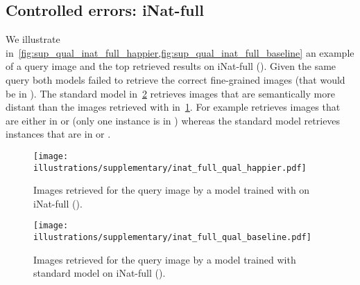 \subsection{Controlled errors: iNat-full} 

We illustrate in~\cref{fig:sup_qual_inat_full_happier,fig:sup_qual_inat_full_baseline} an example of a query image and the top  retrieved results on iNat-full (). Given the same query both models failed to retrieve the correct fine-grained images (that would be in ). The standard model in~\cref{fig:sup_qual_inat_full_baseline} retrieves images that are semantically more distant than the images retrieved with \HAPPIER in~\cref{fig:sup_qual_inat_full_happier}. For example \HAPPIER retrieves images that are either in  or  (only one instance is in ) whereas the standard model retrieves instances that are in  or .


\begin{figure}[ht]
    \centering
    \texttt{[image: illustrations/supplementary/inat\_full\_qual\_happier.pdf]}
    \caption{Images retrieved for the \textcolor{amethyst}{query image} by a model trained with \textbf{\HAPPIER} on iNat-full ().}
    \label{fig:sup_qual_inat_full_happier}
\end{figure}


\begin{figure}[ht]
    \centering
    \texttt{[image: illustrations/supplementary/inat\_full\_qual\_baseline.pdf]}
    \caption{Images retrieved for the \textcolor{amethyst}{query image} by a model trained with standard model on iNat-full ().}
    \label{fig:sup_qual_inat_full_baseline}
\end{figure}